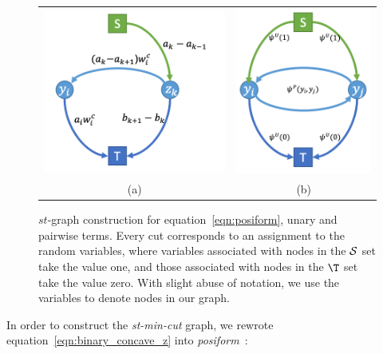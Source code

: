\documentclass[sigconf]{acmart}
\renewcommand{\cite}{\citep}
\begin{document}
\begin{figure}[t]
  \centering
  \setlength{\tabcolsep}{2pt}
  \begin{tabular}{cc}
    \includegraphics[width=0.54\columnwidth]{Methodology/figures/ho.png}&
                                                                         \includegraphics[width=0.4\columnwidth]{Methodology/figures/up.png}\\
                                                                         {\small (a)} & {\small (b)} 
  \end{tabular}
  \caption{\label{fig:stmincut} $st$-graph construction for
    equation~\eqref{eqn:posiform}, unary and pairwise terms.
    Every cut corresponds to an assignment to the random
    variables, where variables associated with nodes in the
    ${\cal S}$ set take the value one, and those associated with
    nodes in the $\T$ set take the value zero. With slight abuse
    of notation, we use the variables to denote nodes in our
    graph.}
\end{figure}



In order to construct the \emph{st-min-cut} graph, we rewrote
equation~\eqref{eqn:binary_concave_z} into
\emph{posiform}~\cite{Boros:MATH02}:
\end{document}
